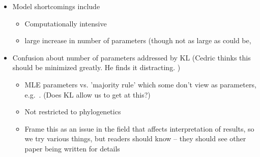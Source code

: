 \documentclass[12pt,letterpaper]{article}
\newcommand{\PC}{physico-chemical\xspace}
\begin{document}
\begin{itemize}
\begin{itemize}
    \begin{itemize}
    \item Primary amino acid sequence is understabilizing selection.
    \item Protein function sensitive to deviation from \PC properties of optimal sequence.
    \item Additional assumptions
      \begin{itemize}
      \item Fitness declines at constant rate $q$ with energy flux allocated to protein synthesis.
      \item Assume gene regulation monitors reaction rates or close proxy and compensates expression accordingly.
      \end{itemize}
      allow us to more explicitly link genotype to phenotype to fitness.
    \end{itemize}
  \item Illustrates how equations can be interpreted and revised based on researchers' biological knowledge and interests.  
  \end{itemize}
\item Model shortcomings include 
  \begin{itemize}
  \item Computationally intensive
  \item large increase in number of parameters (though not as large as could be, \citep[c.f.][HIV entropy models]{RodriguezAndLartillot2014}
  \end{itemize}
\item Confusion about number of parameters addressed by KL (Cedric thinks this should be minimized greatly.  
  He finds it distracting.
)

  \begin{itemize}
  \item MLE parameters vs. 'majority rule' which some don't view as parameters, e.g.~\citet{YangAndNielsen2008}. (Does KL allow us to get at this?)
  \item Not restricted to phylogenetics
  \item Frame this as an issue in the field that affects interpretation of results, so we try various things, but readers should know -- they should see other paper being written for details
  \end{itemize}
\end{itemize}
\end{document}

